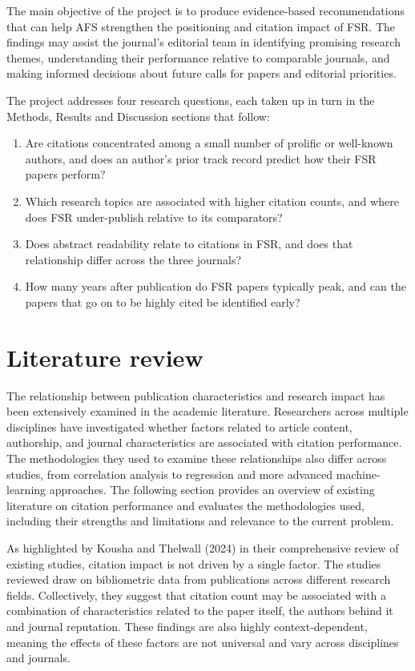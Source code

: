 \documentclass[11pt,a4paper]{article}
\begin{document}
The main objective of the project is to produce evidence-based recommendations that can help AFS strengthen the positioning and citation impact of FSR. The findings may assist the journal's editorial team in identifying promising research themes, understanding their performance relative to comparable journals, and making informed decisions about future calls for papers and editorial priorities.

The project addresses four research questions, each taken up in turn in the Methods, Results and Discussion sections that follow:

\begin{enumerate}
\item[\textbf{A.}] Are citations concentrated among a small number of prolific or well-known authors, and does an author's prior track record predict how their FSR papers perform?
\item[\textbf{B.}] Which research topics are associated with higher citation counts, and where does FSR under-publish relative to its comparators?
\item[\textbf{C.}] Does abstract readability relate to citations in FSR, and does that relationship differ across the three journals?
\item[\textbf{D.}] How many years after publication do FSR papers typically peak, and can the papers that go on to be highly cited be identified early?
\end{enumerate}

\section{Literature review}\label{literature-review}

The relationship between publication characteristics and research impact has been extensively examined in the academic literature. Researchers across multiple disciplines have investigated whether factors related to article content, authorship, and journal characteristics are associated with citation performance. The methodologies they used to examine these relationships also differ across studies, from correlation analysis to regression and more advanced machine-learning approaches. The following section provides an overview of existing literature on citation performance and evaluates the methodologies used, including their strengths and limitations and relevance to the current problem.

As highlighted by Kousha and Thelwall (2024) in their comprehensive review of existing studies, citation impact is not driven by a single factor. The studies reviewed draw on bibliometric data from publications across different research fields. Collectively, they suggest that citation count may be associated with a combination of characteristics related to the paper itself, the authors behind it and journal reputation. These findings are also highly context-dependent, meaning the effects of these factors are not universal and vary across disciplines and journals.
\end{document}
